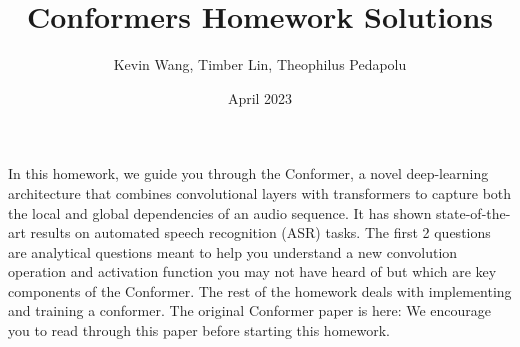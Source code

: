 \documentclass{article}
\title{Conformers Homework Solutions}
\author{Kevin Wang, Timber Lin, Theophilus Pedapolu}
\date{April 2023}
\begin{document}
\maketitle
\thispagestyle{plain}
\noindent
In this homework, we guide you through the Conformer, a novel deep-learning architecture that combines convolutional layers with transformers to capture both the local and global dependencies of an audio sequence. It has shown state-of-the-art results on automated speech recognition (ASR) tasks. The first 2 questions are analytical questions meant to help you understand a new convolution operation and activation function you may not have heard of but which are key components of the Conformer. The rest of the homework deals with implementing and training a conformer. The original Conformer paper is here: \href{https://arxiv.org/abs/2005.08100}{\color{blue}{https://arxiv.org/abs/2005.08100}} We encourage you to read through this paper before starting this homework.

\newpage
\thispagestyle{plain}
\end{document}
